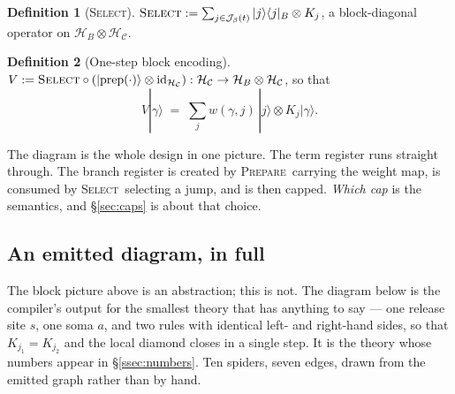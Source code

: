 \documentclass[11pt]{article}
\theoremstyle{definition}
\newtheorem{definition}{Definition}[section]
\theoremstyle{plain}
\newcommand{\Cfg}{\mathcal{C}}
\newcommand{\Hs}{\mathcal{H}}
\newcommand{\Hc}{\Hs_{\Cfg}}
\newcommand{\Hb}{\Hs_{B}}
\newcommand{\Jumps}{\mathcal{J}}
\newcommand{\PREP}{\textsc{Prepare}}
\newcommand{\SEL}{\textsc{Select}}
\newcommand{\id}{\mathrm{id}}
\newcommand{\ket}[1]{| #1 \rangle}
\newcommand{\ketbra}[2]{| #1 \rangle\langle #2 |}
\begin{document}
\begin{definition}[\SEL]\label{def:select}
$\SEL := \sum_{j \in \Jumps_\beta(t)} \ketbra{j}{j}_B \otimes K_j$, a block-diagonal operator on
$\Hb \otimes \Hc$.
\end{definition}

\begin{definition}[One-step block encoding]\label{def:V}
$V := \SEL \circ (\ket{\mathrm{prep}(\cdot)} \otimes \id_{\Hc}) : \Hc \to \Hb\otimes\Hc$, so that
\[
  V\ket{\gamma} \;=\; \sum_{j} w(\gamma,j)\,\ket{j}\otimes K_j\ket{\gamma}.
\]
\end{definition}

\begin{center}
\end{center}

The diagram is the whole design in one picture. The term register runs straight through. The
branch register is created by \PREP\ carrying the weight map, is consumed by \SEL\ selecting a
jump, and is then capped. \emph{Which cap} is the semantics, and \S\ref{sec:caps} is about that
choice.

\subsection{An emitted diagram, in full}\label{ssec:infull}

The block picture above is an abstraction; this is not. The diagram below is the
compiler's output for the smallest theory that has anything to say --- one
release site $s$, one soma $a$, and two rules with identical left- and
right-hand sides, so that $K_{j_1} = K_{j_2}$ and the local diamond closes in a
single step. It is the theory whose numbers appear in
\S\ref{ssec:numbers}. Ten spiders, seven edges, drawn from the emitted graph
rather than by hand.
\end{document}
